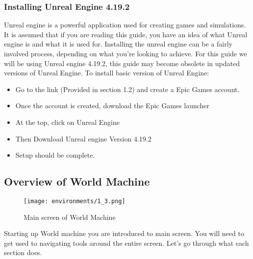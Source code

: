 \documentclass[../main.tex]{subfiles}
\begin{document}
\subsubsection{Installing Unreal Engine 4.19.2}
Unreal engine is a powerful application used for creating games and simulations. It is assumed that if you are reading this guide, you have an idea of what Unreal engine is and what it is used for. Installing the unreal engine can be a fairly involved process, depending on what you're looking to achieve.
For this guide we will be using Unreal engine 4.19.2, this guide may become obsolete in updated versions of Unreal Engine.
To install basic version of Unreal Engine:
\begin{itemize}
    \item Go to the link (Provided in section 1.2) and create a Epic Games account.
    \item Once the account is created, download the Epic Games launcher
    \item At the top, click on Unreal Engine
    \item Then Download Unreal engine Version 4.19.2
    \item Setup should be complete.
\end{itemize}

\subsection{Overview of World Machine}
\begin{figure}[H]
\texttt{[image: environments/1\_3.png]}
\caption{Main screen of World Machine}
\end{figure}
Starting up World machine you are introduced to main screen. You will need to get used to navigating tools around the entire screen. Let’s go through what each section does. 
\end{document}
